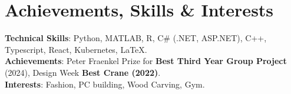 \documentclass[a4paper,11pt]{article}
\begin{document}
\section{Achievements, Skills \& Interests}
 \begin{itemize}[leftmargin=0.15in, label={}]
    \small{\item{
    \vspace{1mm}
     \textbf{Technical Skills}{: Python, MATLAB, R, C\# (.NET, ASP.NET), C++, Typescript, React, Kubernetes, \LaTeX.} \\
     \vspace{1mm}
      \textbf{Achievements}{: Peter Fraenkel Prize for \textbf{Best Third Year Group Project} (2024), Design Week \textbf{Best Crane (2022)}.} \\
     \textbf{Interests}{: Fashion, PC building, Wood Carving, Gym.} \\
     \vspace{1mm}

    }}
 \end{itemize}
\end{document}
